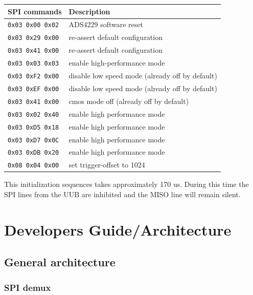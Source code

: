 \documentclass[a4paper,indent]{paper}
\begin{document}
\begin{center}
  \begin{tabular}{|l|l|}
    \hline
    \acs{SPI} commands & Description \\
    \hline
    \texttt{0x03 0x00 0x02} & ADS4229 software reset \\
    \texttt{0x03 0x29 0x00} & re-assert default configuration \\
    \texttt{0x03 0x41 0x00} & re-assert default configuration \\
    \texttt{0x03 0x03 0x03} & enable high-performance mode \\
    \texttt{0x03 0xF2 0x00} & disable low speed mode (already off by default)\\
    \texttt{0x03 0xEF 0x00} & disable low speed mode (already off by default)\\
    \texttt{0x03 0x41 0x00} & cmos mode off (already off by default)\\
    \texttt{0x03 0x02 0x40} & enable high performance mode \\
    \texttt{0x03 0xD5 0x18} & enable high performance mode \\
    \texttt{0x03 0xD7 0x0C} & enable high performance mode \\
    \texttt{0x03 0xDB 0x20} & enable high performance mode \\
    \texttt{0x08 0x04 0x00} & set trigger-offset to 1024 \\
    \hline
  \end{tabular}
  
\end{center}

This initialization sequences takes approximately 170 us. During this time the \ac{SPI} lines from the \ac{UUB} are inhibited and the MISO line will remain silent.




\section{Developers Guide/Architecture}
\subsection{General architecture}
\subsubsection{\acs{SPI} demux}
\end{document}
